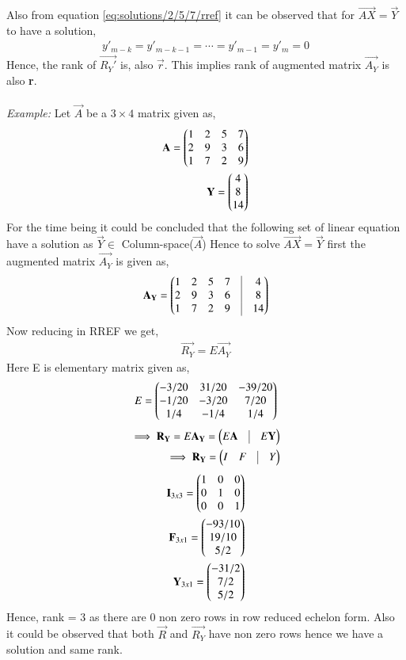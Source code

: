 Also from equation \eqref{eq:solutions/2/5/7/rref} it can be observed that for   $\vec{AX}=\vec{Y}$ to have a solution,
\begin{align}
y'_{m-k} = y'_{m-k-1} = \cdots = y'_{m-1} = y'_{m} = 0 
\end{align} 
Hence, the rank of $\vec{R_Y'}$ is, also $\vec{r}$. This implies rank of augmented matrix $\vec{A_Y}$ is also \textbf{r}. \\
\\
{\em Example: }
Let $\vec{A}$ be a $3\times 4$ matrix given as,
\begin{align}
\mathbf{A} = \begin{pmatrix}1&2&5&7\\2&9&3&6\\1&7&2&9\end{pmatrix}\\
\mathbf{Y} = \begin{pmatrix}4\\8\\14\end{pmatrix}
\end{align}
For the time being it could be concluded that the following set of linear equation have a solution as $\vec{Y} \in$ Column-space($\vec{A}$)
Hence to solve $\vec{AX} = \vec{Y}$ first the augmented matrix $\vec{A_Y}$ is given as,
\begin{align}
\vec{A_Y} = \myvec{1&2&5&7&\vrule&4\\2&9&3&6&\vrule&8\\1&7&2&9&\vrule&14}
\end{align}
Now reducing in RREF we get,
\begin{align}
\vec{R_Y} = E\vec{A_Y}
\end{align}
Here E is elementary matrix given as,
\begin{align}
E = \begin{pmatrix}-3/20&31/20&-39/20\\-1/20&-3/20&7/20\\1/4&-1/4&1/4\end{pmatrix}
\end{align}
\begin{align}
\implies \vec{R_Y} = E\vec{A_Y} = \myvec{E\vec{A}&\vrule&E\vec{Y}}\\
\implies \vec{R_Y} =\myvec{I&F&\vrule&Y} 
\end{align}
\begin{align}
\mathbf{I}_{3x3} = \begin{pmatrix}1&0&0\\0&1&0\\0&0&1\end{pmatrix}\\
\mathbf{F}_{3x1} = \begin{pmatrix}-93/10\\19/10\\5/2\end{pmatrix}\\
\mathbf{Y}_{3x1} = \begin{pmatrix}-31/2\\7/2\\5/2\end{pmatrix}
\end{align}
Hence, rank = 3 as there are 0 non zero rows in row reduced echelon form. Also it could be observed that both $\vec{R}$ and $\vec{R_Y}$ have non zero rows hence we have a solution and same rank.  

